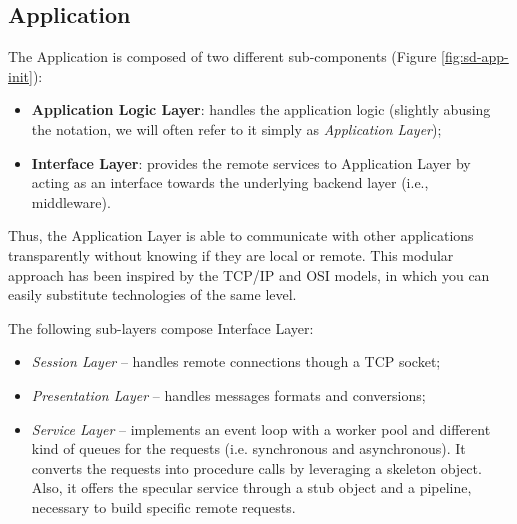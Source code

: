 \subsection{Application}
The Application is composed of two different sub-components (Figure
\ref{fig:sd-app-init}):

\begin{itemize}
  \item \textbf{Application Logic Layer}: handles the application logic
    (slightly abusing the notation, we will often refer to it simply as
    \textit{Application Layer});
  \item \textbf{Interface Layer}: provides the remote services to Application
    Layer by acting as an interface towards the underlying backend layer (i.e.,
    middleware).
\end{itemize}

Thus, the Application Layer is able to communicate with other applications
transparently without knowing if they are local or remote. This modular
approach has been inspired by the TCP/IP and OSI models, in which you can
easily substitute technologies of the same level.

The following sub-layers compose Interface Layer:

\begin{itemize}
	\item \textit{Session Layer} --
	handles remote connections though a TCP socket;
	\item \textit{Presentation Layer} --
	handles messages formats and conversions;
	\item \textit{Service Layer} --
	implements an event loop with a worker pool and different kind of queues
	for the requests (i.e. synchronous and asynchronous). It converts the
	requests into procedure calls by leveraging a skeleton object.
	Also, it offers the specular service through a stub object and a pipeline,
	necessary to build specific remote requests.
\end{itemize}



